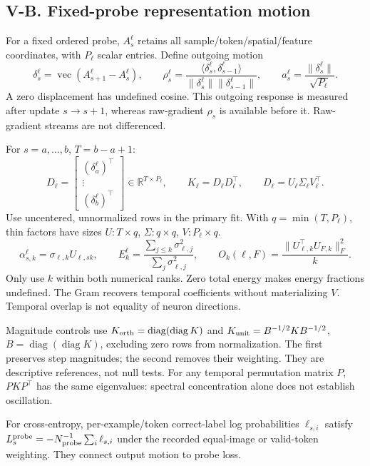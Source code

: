 \subsection*{V-B. Fixed-probe representation motion}
For a fixed ordered probe, $A_s^\ell$ retains all sample/token/spatial/feature
coordinates, with $P_\ell$ scalar entries. Define outgoing motion
\begin{equation}
\delta_s^\ell=\operatorname{vec}(A_{s+1}^\ell-A_s^\ell),\qquad
\rho_s^\ell=\frac{\langle\delta_s^\ell,\delta_{s-1}^\ell\rangle}
{\|\delta_s^\ell\|\|\delta_{s-1}^\ell\|},\qquad
a_s^\ell=\frac{\|\delta_s^\ell\|}{\sqrt{P_\ell}} .
\label{consol:trace-motion}
\end{equation}
A zero displacement has undefined cosine. This outgoing response is measured
after update $s\to s+1$, whereas raw-gradient $\rho_s$ is available before it.
Raw-gradient streams are not differenced.

For $s=a,\ldots,b$, $T=b-a+1$:
\begin{equation}
D_\ell=
\begin{bmatrix}(\delta_a^\ell)^\top\\ \vdots\\(\delta_b^\ell)^\top\end{bmatrix}
\in\mathbb R^{T\times P_\ell},\qquad
K_\ell=D_\ell D_\ell^\top,\qquad
D_\ell=U_\ell\Sigma_\ell V_\ell^\top .
\label{consol:trace-svd}
\end{equation}
Use uncentered, unnormalized rows in the primary fit.
With $q=\min(T,P_\ell)$, thin factors have sizes
$U:T\times q$, $\Sigma:q\times q$, $V:P_\ell\times q$.
\begin{equation}
\alpha_{s,k}^\ell=\sigma_{\ell,k}U_{\ell,sk},\qquad
E_k^\ell=\frac{\sum_{j\leq k}\sigma_{\ell,j}^2}{\sum_j\sigma_{\ell,j}^2},
\qquad
O_k(\ell,F)=\frac{\|U_{\ell,k}^\top U_{F,k}\|_F^2}{k}.
\label{consol:trace-summaries}
\end{equation}
Only use $k$ within both numerical ranks. Zero total energy makes energy fractions
undefined. The Gram recovers temporal coefficients without materializing $V$.
Temporal overlap is not equality of neuron directions.

Magnitude controls use $K_{\rm orth}=\operatorname{diag}(\operatorname{diag}K)$ and
$K_{\rm unit}=B^{-1/2}KB^{-1/2}$, $B=\operatorname{diag}(\operatorname{diag}K)$,
excluding zero rows from normalization. The first preserves step magnitudes;
the second removes their weighting. They are descriptive references, not null tests.
For any temporal permutation matrix $P$, $PKP^\top$ has the same eigenvalues:
spectral concentration alone does not establish oscillation.

For cross-entropy, per-example/token correct-label log probabilities $\ell_{s,i}$
satisfy $L_s^{\rm probe}=-N_{\rm probe}^{-1}\sum_i\ell_{s,i}$ under the recorded
equal-image or valid-token weighting. They connect output motion to probe loss.

